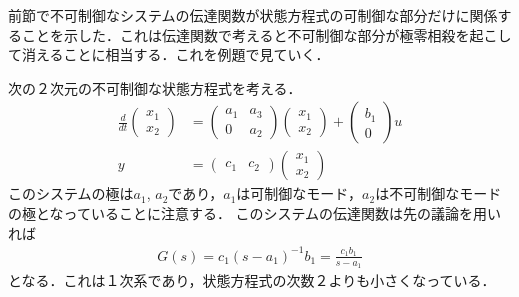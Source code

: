 前節で不可制御なシステムの伝達関数が状態方程式の可制御な部分だけに関係することを示した．これは伝達関数で考えると不可制御な部分が極零相殺を起こして消えることに相当する．これを例題で見ていく．

次の２次元の不可制御な状態方程式を考える．
\begin{align}
 \frac{d}{dt}
  \left(\begin{array}{c}
         {x}_1 \\
	 {x}_2 
	\end{array}\right)
  &=
  \left(\begin{array}{cc}
         a_1 & a_3 \\
	     0 & a_2
	\end{array}\right)
  \left(\begin{array}{c}
         {x}_1 \\
	 {x}_2 
	\end{array}\right)
  +
  \left(\begin{array}{c}
         b_1 \\
	 0
	\end{array}\right)
  u \\
 y &=
  \left(\begin{array}{cc}
         c_1 & c_2 
	\end{array}\right)
  \left(\begin{array}{c}
         {x}_1 \\
	 {x}_2 
	\end{array}\right)
\end{align}
このシステムの極は$a_1$, $a_2$であり，$a_1$は可制御なモード，$a_2$は不可制御なモードの極となっていることに注意する．
このシステムの伝達関数は先の議論を用いれば
\begin{align}
	G(s) = c_1 (s - a_1) ^{-1} b_1 = \frac{c_1 b_1}{s - a_1}
\end{align}
となる．これは１次系であり，状態方程式の次数２よりも小さくなっている．

